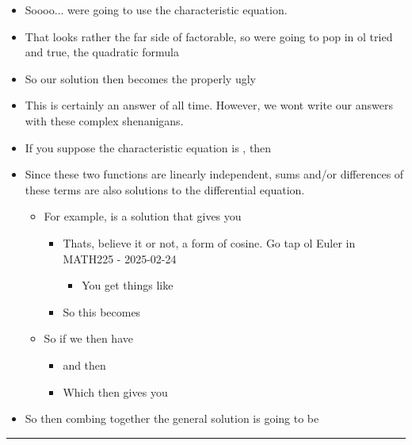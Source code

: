 \documentclass[
]{article}
\providecommand{\tightlist}{%
  \setlength{\itemsep}{0pt}\setlength{\parskip}{0pt}}
\begin{document}
\begin{itemize}
\tightlist
\item
  Soooo... we\textquotesingle re going to use the characteristic
  equation. {}
\item
  That looks rather the far side of factorable, so we\textquotesingle re
  going to pop in ol tried and true, the quadratic formula
\item
  So our solution then becomes the properly ugly {}
\item
  This is certainly an answer of all time. However, we
  won\textquotesingle t write our answers with these complex
  shenanigans.
\item
  If you suppose the characteristic equation is {}, then {}
\item
  Since these two functions are linearly independent, sums and/or
  differences of these terms are also solutions to the differential
  equation.

  \begin{itemize}
  \tightlist
  \item
    For example, {} is a solution that gives you {}

    \begin{itemize}
    \tightlist
    \item
      That\textquotesingle s, believe it or not, a form of cosine. Go
      tap ol\textquotesingle{} Euler in MATH225 - 2025-02-24

      \begin{itemize}
      \tightlist
      \item
        You get things like {}
      \end{itemize}
    \item
      So this becomes {}
    \end{itemize}
  \item
    So if we then have {}

    \begin{itemize}
    \tightlist
    \item
      and then {}
    \item
      Which then gives you {}
    \end{itemize}
  \end{itemize}
\item
  So then combing together the general solution is going to be {}
\end{itemize}

\begin{center}\rule{0.5\linewidth}{0.5pt}\end{center}
\end{document}
